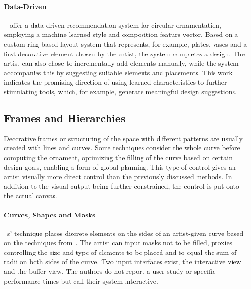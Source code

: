 \paragraph*{Data-Driven}
\label{para:analysis_element_arrangements_datadriven}

\citeauthor*{phan_2016_ple}~\cite{phan_2016_ple} offer a data-driven recommendation system for circular ornamentation, employing a machine learned style and composition feature vector. Based on a custom ring-based layout system that represents, for example, plates, vases and a first decorative element chosen by the artist, the system completes a design. The artist can also chose to incrementally add elements manually, while the system accompanies this by suggesting suitable elements and placements. This work indicates the promising direction of using learned characteristics to further stimulating tools, which, for example, generate meaningful design suggestions.



\subsection{Frames and Hierarchies}
\label{subsec:analysis_frames_and_hierarchies}

Decorative frames or structuring of the space with different patterns are usually created with lines and curves. Some techniques consider the whole curve before computing the ornament, optimizing the filling of the curve based on certain design goals, enabling a form of global planning. This type of control gives an artist visually more direct control than the previously discussed methods. In addition to the visual output being further constrained, the control is put onto the actual canvas. 

\paragraph*{Curves, Shapes and Masks} \citeauthor*{anderson_2008_udt}~\cite{anderson_2008_udt}s' technique places discrete elements on the sides of an artist-given curve based on the techniques from~\cite{wong_1998_cgf}. The artist can input masks not to be filled, proxies controlling the size and type of elements to be placed and to equal the sum of radii on both sides of the curve. Two input interfaces exist, the interactive view and the buffer view. The authors do not report a user study or specific performance times but call their system interactive.  

